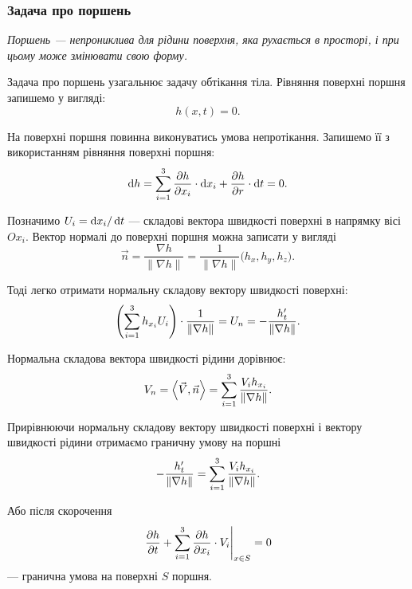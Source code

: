 \subsubsection{Задача про поршень}

\begin{definition}[поршня]
	\it{Поршень} --- непрониклива для рідини поверхня, яка рухається в просторі, і при цьому може змінювати свою форму. 
\end{definition}

Задача про поршень узагальнює задачу обтікання тіла. Рівняння поверхні поршня запишемо у вигляді:
\begin{equation}
	h(x, t) = 0.
\end{equation}

На поверхні поршня повинна виконуватись умова непротікання. Запишемо її з використанням рівняння поверхні поршня:
\begin{equation}
	\mathop{}\!\mathrm{d} h = \displaystyle\sum\limits_{i = 1}^3 \frac{\partial h}{\partial x_i} \cdot \mathop{}\!\mathrm{d} x_i + \frac{\partial h}{\partial r} \cdot \mathop{}\!\mathrm{d} t = 0.
\end{equation}

Позначимо $U_i = \mathop{}\!\mathrm{d} x_i / \mathop{}\!\mathrm{d} t$ --- складові вектора швидкості поверхні в напрямку вісі $Ox_i$. Вектор нормалі до поверхні поршня можна записати у вигляді
\begin{equation}
	\vec n = \frac{\nabla h}{\|\nabla h\|} = \frac{1}{\|\nabla h\|} \big( h_x, h_y, h_z \big).
\end{equation}

Тоді легко отримати нормальну складову вектору швидкості поверхні:
\begin{equation}
	\left( \displaystyle\sum\limits_{i = 1}^3 h_{x_i} U_i \right) \cdot \frac{1}{\|\nabla h\|} = U_n = - \frac{h_t'}{\|\nabla h\|}.
\end{equation}

Нормальна складова вектора швидкості рідини дорівнює:
\begin{equation}
	V_n = \left\langle \vec V, \vec n\right\rangle = \displaystyle\sum\limits_{i = 1}^3 \frac{V_i h_{x_i}}{\|\nabla h\|}.
\end{equation}

Прирівнюючи нормальну складову вектору швидкості поверхні і вектору швидкості рідини отримаємо граничну умову на поршні 
\begin{equation}
	- \frac{h_t'}{\|\nabla h\|} = \displaystyle\sum\limits_{i = 1}^3 \frac{V_i h_{x_i}}{\|\nabla h\|}.
\end{equation}

Або після скорочення
\begin{equation}
	\left. \frac{\partial h}{\partial t} + \displaystyle\sum\limits_{i = 1}^3 \frac{\partial h}{\partial x_i} \cdot V_i \right|_{x \in S} = 0
\end{equation}
--- гранична умова на поверхні $S$ поршня.

